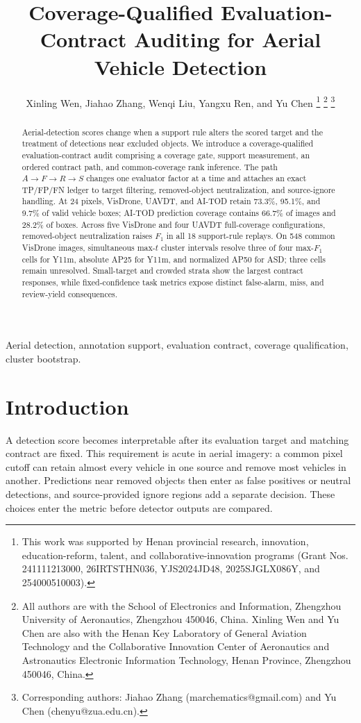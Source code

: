 \documentclass[journal]{IEEEtran}
\title{Coverage-Qualified Evaluation-Contract Auditing for Aerial Vehicle Detection}
\author{Xinling Wen, Jiahao Zhang, Wenqi Liu, Yangxu Ren, and Yu Chen%
\thanks{This work was supported by Henan provincial research, innovation, education-reform, talent, and collaborative-innovation programs (Grant Nos. 241111213000, 26IRTSTHN036, YJS2024JD48, 2025SJGLX086Y, and 254000510003).}%
\thanks{All authors are with the School of Electronics and Information, Zhengzhou University of Aeronautics, Zhengzhou 450046, China. Xinling Wen and Yu Chen are also with the Henan Key Laboratory of General Aviation Technology and the Collaborative Innovation Center of Aeronautics and Astronautics Electronic Information Technology, Henan Province, Zhengzhou 450046, China.}%
\thanks{Corresponding authors: Jiahao Zhang (marchematics@gmail.com) and Yu Chen (chenyu@zua.edu.cn).}}
\begin{document}
\maketitle
\begin{abstract}
Aerial-detection scores change when a support rule alters the scored target and the treatment of detections near excluded objects. We introduce a coverage-qualified evaluation-contract audit comprising a coverage gate, support measurement, an ordered contract path, and common-coverage rank inference. The path $A\!\rightarrow\!F\!\rightarrow\!R\!\rightarrow\!S$ changes one evaluator factor at a time and attaches an exact TP/FP/FN ledger to target filtering, removed-object neutralization, and source-ignore handling. At 24 pixels, VisDrone, UAVDT, and AI-TOD retain 73.3\%, 95.1\%, and 9.7\% of valid vehicle boxes; AI-TOD prediction coverage contains 66.7\% of images and 28.2\% of boxes. Across five VisDrone and four UAVDT full-coverage configurations, removed-object neutralization raises $F_1$ in all 18 support-rule replays. On 548 common VisDrone images, simultaneous max-$t$ cluster intervals resolve three of four max-$F_1$ cells for Y11m, absolute AP25 for Y11m, and normalized AP50 for ASD; three cells remain unresolved. Small-target and crowded strata show the largest contract responses, while fixed-confidence task metrics expose distinct false-alarm, miss, and review-yield consequences.
\end{abstract}
\begin{IEEEkeywords}Aerial detection, annotation support, evaluation contract, coverage qualification, cluster bootstrap.
\end{IEEEkeywords}

\section{Introduction}
A detection score becomes interpretable after its evaluation target and matching contract are fixed. This requirement is acute in aerial imagery: a common pixel cutoff can retain almost every vehicle in one source and remove most vehicles in another. Predictions near removed objects then enter as false positives or neutral detections, and source-provided ignore regions add a separate decision. These choices enter the metric before detector outputs are compared.
\end{document}
